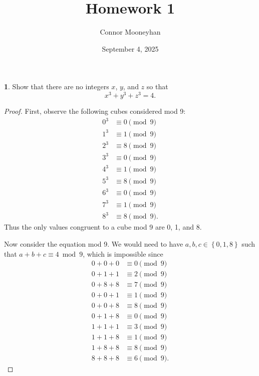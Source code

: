 \documentclass[12pt]{article}
\title{Homework 1}
\author{Connor Mooneyhan}
\date{September 4, 2025}
\theoremstyle{definition}
\newtheorem{ex}{}
\begin{document}
\maketitle

\begin{ex}
	Show that there are no integers $x$, $y$, and $z$ so that \begin{equation*}
		x^3 + y^3 + z^3 = 4.
	\end{equation*}
\end{ex}
\begin{proof}
	First, observe the following cubes considered mod 9: \begin{align*}
		0^3 & \equiv 0 \pmod 9  \\
		1^3 & \equiv 1 \pmod 9  \\
		2^3 & \equiv 8 \pmod 9  \\
		3^3 & \equiv 0 \pmod 9  \\
		4^3 & \equiv 1 \pmod 9  \\
		5^3 & \equiv 8 \pmod 9  \\
		6^3 & \equiv 0 \pmod 9  \\
		7^3 & \equiv 1 \pmod 9  \\
		8^3 & \equiv 8 \pmod 9.
	\end{align*}
	Thus the only values congruent to a cube mod 9 are 0, 1, and 8.

	Now consider the equation mod 9.
	We would need to have $a,b,c \in \left\lbrace 0, 1, 8 \right\rbrace$ such that $a + b + c \equiv 4 \bmod 9$, which is impossible since \begin{align*}
		0 + 0 + 0 & \equiv 0 \pmod 9  \\
		0 + 1 + 1 & \equiv 2 \pmod 9  \\
		0 + 8 + 8 & \equiv 7 \pmod 9  \\
		0 + 0 + 1 & \equiv 1 \pmod 9  \\
		0 + 0 + 8 & \equiv 8 \pmod 9  \\
		0 + 1 + 8 & \equiv 0 \pmod 9  \\
		1 + 1 + 1 & \equiv 3 \pmod 9  \\
		1 + 1 + 8 & \equiv 1 \pmod 9  \\
		1 + 8 + 8 & \equiv 8 \pmod 9  \\
		8 + 8 + 8 & \equiv 6 \pmod 9.
	\end{align*}
\end{proof}
\end{document}
